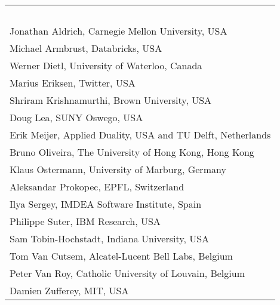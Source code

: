 \documentclass[10pt]{book}
\begin{document}
\begin{table}[ht]
\begin{minipage}[b]{0.55\linewidth}
\begin{tabular}{l}
~\\
Jonathan Aldrich, Carnegie Mellon University, USA\\
Michael Armbrust, Databricks, USA\\
Werner Dietl, University of Waterloo, Canada\\
Marius Eriksen, Twitter, USA\\
Shriram Krishnamurthi, Brown University, USA\\
Doug Lea, SUNY Oswego, USA\\
Erik Meijer, Applied Duality, USA and TU Delft, Netherlands\\
Bruno Oliveira, The University of Hong Kong, Hong Kong\\
Klaus Ostermann, University of Marburg, Germany\\
Aleksandar Prokopec, EPFL, Switzerland\\
Ilya Sergey, IMDEA Software Institute, Spain\\
Philippe Suter, IBM Research, USA\\
Sam Tobin-Hochstadt, Indiana University, USA\\
Tom Van Cutsem, Alcatel-Lucent Bell Labs, Belgium\\
Peter Van Roy, Catholic University of Louvain, Belgium\\
Damien Zufferey, MIT, USA\\
\end{tabular}
\end{minipage}
\end{table}

\end{document}
